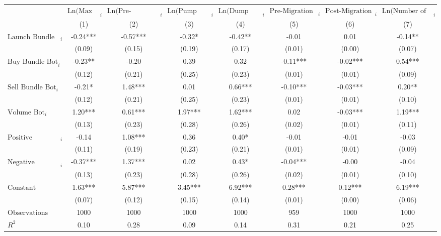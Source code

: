 \begin{tabular}{lccccccc}
\hline
 & $\text{Ln(Max Ret)}_{i}$ & $\text{Ln(Pre-Migration Duration)}_{i}$ & $\text{Ln(Pump Duration)}_{i}$ & $\text{Ln(Dump Duration)}_{i}$ & $\text{Pre-Migration Volatility}_{i}$ & $\text{Post-Migration Volatility}_{i}$ & $\text{Ln(Number of Traders)}_{i}$ \\
 & (1) & (2) & (3) & (4) & (5) & (6) & (7)\\
\hline
$\text{Launch Bundle Bot}_{i}$ & -0.24*** & -0.57*** & -0.32* & -0.42** & -0.01 & 0.01 & -0.14** \\
 & (0.09) & (0.15) & (0.19) & (0.17) & (0.01) & (0.00) & (0.07) \\
$\text{Buy Bundle Bot}_{i}$ & -0.23** & -0.20 & 0.39 & 0.32 & -0.11*** & -0.02*** & 0.54*** \\
 & (0.12) & (0.21) & (0.25) & (0.23) & (0.01) & (0.01) & (0.09) \\
$\text{Sell Bundle Bot}_{i}$ & -0.21* & 1.48*** & 0.01 & 0.66*** & -0.10*** & -0.03*** & 0.20** \\
 & (0.12) & (0.21) & (0.25) & (0.23) & (0.01) & (0.01) & (0.10) \\
$\text{Volume Bot}_{i}$ & 1.20*** & 0.61*** & 1.97*** & 1.62*** & 0.02 & -0.03*** & 1.19*** \\
 & (0.13) & (0.23) & (0.28) & (0.26) & (0.02) & (0.01) & (0.11) \\
$\text{Positive Comment Bot}_{i}$ & -0.14 & 1.08*** & 0.36 & 0.40* & -0.01 & -0.01 & -0.03 \\
 & (0.11) & (0.19) & (0.23) & (0.21) & (0.01) & (0.01) & (0.09) \\
$\text{Negative Comment Bot}_{i}$ & -0.37*** & 1.37*** & 0.02 & 0.43* & -0.04*** & -0.00 & -0.04 \\
 & (0.13) & (0.23) & (0.28) & (0.26) & (0.02) & (0.01) & (0.10) \\
$\text{Constant}$ & 1.63*** & 5.87*** & 3.45*** & 6.92*** & 0.28*** & 0.12*** & 6.19*** \\
 & (0.07) & (0.12) & (0.15) & (0.14) & (0.01) & (0.00) & (0.06) \\
$\text{Observations}$ & 1000 & 1000 & 1000 & 1000 & 959 & 1000 & 1000 \\
$R^2$ & 0.10 & 0.28 & 0.09 & 0.14 & 0.31 & 0.21 & 0.25 \\
\hline
\end{tabular}